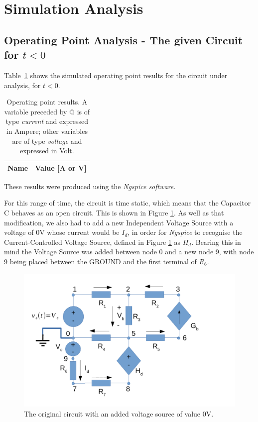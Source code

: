 \newpage

\section{Simulation Analysis}
\label{sec:simulation}

\subsection{Operating Point Analysis - The given Circuit for $t<0$}

Table~\ref{tab:sim1} shows the simulated operating point results for the circuit under analysis, for $t<0$.

\begin{table}[htb!]
  \centering
  \begin{tabular}{|l|r|}
    \hline    
    {\bf Name} & {\bf Value [A or V]} \\ \hline
    
  \end{tabular}
  \caption{Operating point results. A variable preceded by @ is of type {\em current}
    and expressed in Ampere; other variables are of type {\it voltage} and expressed in
    Volt.}
  \label{tab:sim1}
\end{table}

These results were produced using the \textit{Ngspice software}.

For this range of time, the circuit is time static, which means that the Capacitor C behaves as an open circuit. This is shown in Figure \ref{fig:sim1}.
As well as that modification, we also had to add a new Independent Voltage Source with a voltage of 0V whose current would be $I_d$, in order for \textit{Ngspice} to recognise the Current-Controlled Voltage Source, defined in Figure \ref{fig:sim1} as $H_d$. Bearing this in mind the Voltage Source was added between node 0 and a new node 9, with node 9 being placed between the GROUND and the first terminal of $R_6$.

\begin{figure}[h] \centering
\includegraphics[width=0.4\linewidth]{t2-t-1-new-0V.pdf}
\caption{The original circuit with an added voltage source of value 0V.}
\label{fig:sim1}
\end{figure}

